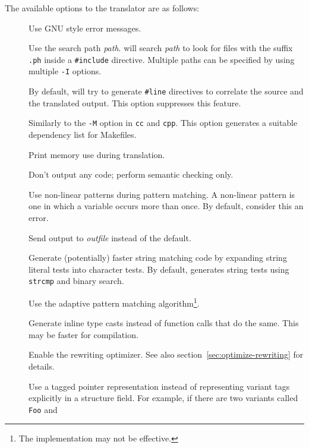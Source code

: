 The available options to the translator are as follows:
\begin{description}
\item[]      Use GNU style error messages.
\item[] Use the search path {\em path}.
\Prop{} will search {\em path} to look for \Prop{} files with 
the suffix \verb|.ph| inside a \verb|#include| directive.  Multiple
paths can be specified by using multiple \verb|-I| options.
\item[]   By default, \Prop{} will try
to generate \verb|#line| directives to correlate the source and
the translated output.  This option suppresses this feature.
\item[]  Similarly to the \verb|-M| option
in \verb|cc| and \verb|cpp|.  This option generates a suitable dependency
list for Makefiles.
\item[]  Print memory use during translation.
\item[]  
Don't output any code; perform semantic checking 
only.
\item[]  
Use non-linear patterns during pattern matching.
A non-linear pattern is one in which a variable occurs more than
once.   By default, \Prop{} consider this an error.
\item[]  Send output to {\em outfile} instead of 
the default.
\item[]  
Generate (potentially) faster string matching
code by expanding string literal tests into character tests.  By default, 
\Prop{} generates string tests using \verb|strcmp| and binary search.
\item[]  Use the adaptive pattern matching 
algorithm\footnote{The implementation may not be effective.}.
\item[]  
Generate inline type casts instead of function
calls that do the same.  This may be faster for compilation.
\item[]  Enable the rewriting optimizer. 
See also section~\ref{sec:optimize-rewriting} for details.
\item[]  
Use a tagged pointer representation instead
of representing variant tags explicitly in a structure field.  For
example, if there are two variants called \verb|Foo| and

\end{description}
